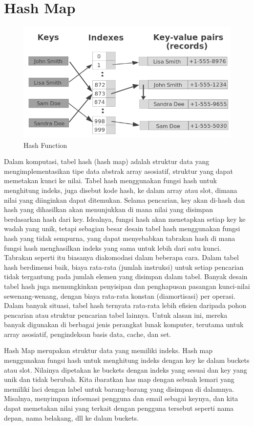 \section{Hash Map}
\begin{figure}[H]
        \centerline{\includegraphics[scale=0.5]{figures/hash-tables/hash-function}}
        \caption{Hash Function}
\end{figure}
Dalam komputasi, tabel hash (hash map) adalah struktur data yang mengimplementasikan tipe data abstrak array asosiatif, struktur yang dapat memetakan kunci ke nilai. Tabel hash menggunakan fungsi hash untuk menghitung indeks, juga disebut kode hash, ke dalam array atau slot, dimana nilai yang diinginkan dapat ditemukan. Selama pencarian, key akan di-hash dan hash yang dihasilkan akan menunjukkan di mana nilai yang disimpan berdasarkan hash dari key. Idealnya, fungsi hash akan menetapkan setiap key ke wadah yang unik, tetapi sebagian besar desain tabel hash menggunakan fungsi hash yang tidak sempurna, yang dapat menyebabkan tabrakan hash di mana fungsi hash menghasilkan indeks yang sama untuk lebih dari satu kunci. Tabrakan seperti itu biasanya diakomodasi dalam beberapa cara. Dalam tabel hash berdimensi baik, biaya rata-rata (jumlah instruksi) untuk setiap pencarian tidak tergantung pada jumlah elemen yang disimpan dalam tabel. Banyak desain tabel hash juga memungkinkan penyisipan dan penghapusan pasangan kunci-nilai sewenang-wenang, dengan biaya rata-rata konstan (diamortisasi) per operasi. Dalam banyak situasi, tabel hash ternyata rata-rata lebih efisien daripada pohon pencarian atau struktur pencarian tabel lainnya. Untuk alasan ini, mereka banyak digunakan di berbagai jenis perangkat lunak komputer, terutama untuk array asosiatif, pengindeksan basis data, cache, dan set.

Hash Map merupakan struktur data yang memiliki indeks. Hash map menggunakan fungsi hash untuk menghitung indeks dengan key ke dalam buckets atau slot. Nilainya dipetakan ke buckets dengan indeks yang sesuai dan key yang unik dan tidak berubah. Kita ibaratkan has map dengan sebuah lemari yang memiliki laci dengan label untuk barang-barang yang disimpan di dalamnya. Misalnya, menyimpan infoemasi pengguna dan email sebagai keynya, dan kita dapat memetakan nilai yang terkait dengan pengguna tersebut seperti nama depan, nama belakang, dll ke dalam buckets.

